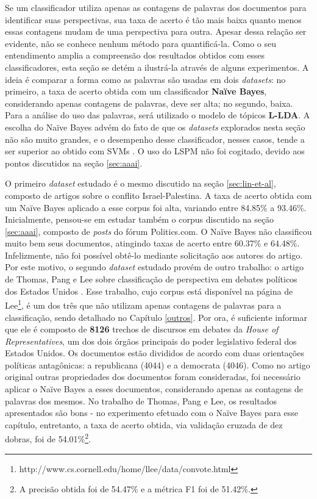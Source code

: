 Se um classificador utiliza apenas as contagens de palavras dos documentos para identificar suas perspectivas, sua taxa de acerto é tão mais baixa quanto menos essas contagens mudam de uma perspectiva para outra. Apesar dessa relação ser evidente, não se conhece nenhum método para quantificá-la. Como o seu entendimento amplia a compreensão dos resultados obtidos com esses classificadores, esta seção se detém a ilustrá-la através de alguns experimentos. A ideia é comparar a forma como as palavras são usadas em dois \emph{datasets}: no primeiro, a taxa de acerto obtida com um classificador \textbf{Naïve Bayes}, considerando apenas contagens de palavras, deve ser alta; no segundo, baixa. Para a análise do uso das palavras, será utilizado o modelo de tópicos \textbf{L-LDA}. A escolha do Naïve Bayes advém do fato de que os \emph{datasets} explorados nesta seção não são muito grandes, e o desempenho desse classificador, nesses casos, tende a ser superior ao obtido com SVMs \cite{ng-jordan}. O uso do LSPM não foi cogitado, devido aos pontos discutidos na seção \ref{sec:aaai}.


O primeiro \emph{dataset} estudado é o mesmo discutido na seção \ref{sec:lin-et-al}, composto de artigos sobre o conflito Israel-Palestina. A taxa de acerto obtida com um Naïve Bayes aplicado a esse corpus foi alta, variando entre 84.85\% a 93.46\%. Inicialmente, pensou-se em estudar também o corpus discutido na seção \ref{sec:aaai}, composto de \emph{posts} do fórum Politics.com. O Naïve Bayes não classificou muito bem seus documentos,  atingindo taxas de acerto entre 60.37\% e 64.48\%. Infelizmente, não foi possível obtê-lo mediante solicitação aos autores do artigo. Por este motivo, o segundo \emph{dataset} estudado provém de outro trabalho: o artigo de Thomas, Pang e Lee sobre classificação de perspectiva em debates políticos dos Estados Unidos \cite{get-out-the-vote}. Esse trabalho, cujo corpus está disponível na página de Lee\footnote{http://www.cs.cornell.edu/home/llee/data/convote.html}, é um dos três que não utilizam apenas contagens de palavras para a classificação, sendo detalhado no Capítulo \ref{outros}. Por ora, é suficiente informar que ele é composto de \textbf{8126} trechos de discursos em debates da \emph{House of Representatives}, um dos dois órgãos principais do poder legislativo federal dos Estados Unidos. Os documentos estão divididos de acordo com duas orientações políticas antagônicas: a republicana  (4044) e a democrata (4046). Como no artigo original outras propriedades dos documentos foram consideradas, foi necessário aplicar o Naïve Bayes a esses documentos, considerando apenas as contagens de palavras dos mesmos. No trabalho de Thomas, Pang e Lee, os resultados apresentados são bons - no experimento efetuado com o Naïve Bayes para esse capítulo, entretanto, a taxa de acerto obtida, via validação cruzada de dez dobras, foi de 54.01\%\footnote{A precisão obtida foi de 54.47\% e a métrica F1 foi de 51.42\%.}.  


